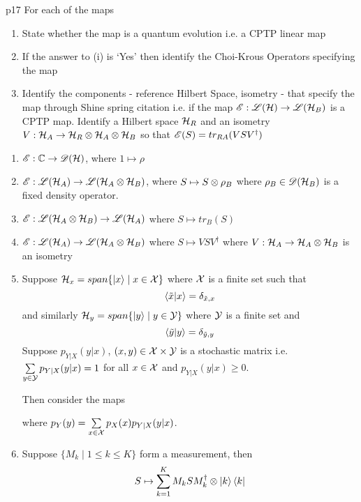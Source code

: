 \documentclass[a4paper, 11pt]{article}
\begin{document}
\begin{problem}{%
	}{p17%
	}
	For each of the maps \begin{enumerate}[label=(\roman*)]
		\item State whether the map is a quantum evolution i.e. a CPTP linear map
		\item If the answer to (i) is `Yes' then identify the Choi-Krous Operators specifying the map
		\item Identify the components - reference Hilbert Space, isometry - that specify the map through Shine spring citation i.e. if the map ${\mathscr{E}}:{\mathscr{L}}(\mathcal{H})\to {\mathscr{L}}(\mathcal{H}_B)$ is a CPTP map. Identify a Hilbert space $\mathcal{H}_R$ and an isometry $V:\mathcal{H}_A\to \mathcal{H}_R\otimes \mathcal{H}_A\otimes \mathcal{H}_B$ so that ${\mathscr{E}}(S)=tr_{RA}(VSV^{\dagger})$
	\end{enumerate}
		\begin{enumerate}[label=(\arabic*)]
			\item ${\mathscr{E}}:\mathbb{C}\to {\mathscr{D}}(\mathcal{H})$, where $1\mapsto \rho$
			\item ${\mathscr{E}}:{\mathscr{L}}(\mathcal{H}_A)\to {\mathscr{L}}(\mathcal{H}_A\otimes \mathcal{H}_B)$, where $S\mapsto S\otimes \rho_B$ where $\rho_B\in {\mathscr{D}}(\mathcal{H}_B)$ is a fixed density operator.
			\item ${\mathscr{E}}:{\mathscr{L}}(\mathcal{H}_A\otimes \mathcal{H}_B)\to{\mathscr{L}}(\mathcal{H}_A) $ where $S\mapsto tr_B(S)$
			\item ${\mathscr{E}}:{\mathscr{L}}(\mathcal{H}_A)\to {\mathscr{L}}(\mathcal{H}_A\otimes \mathcal{H}_B)$ where $S\mapsto VSV^{\dagger}$ where $V:\mathcal{H}_A\to\mathcal{H}_A\otimes \mathcal{H}_B$ is an isometry
			\item Suppose $\mathcal{H}_x=span\{\ket{x}\mid x\in \mathcal{X}\}$ where $\mathcal{X}$ is a finite set such that $$\bra{\tilde{x}}\ket{x}=\delta_{\tilde{x},x}$$and similarly $\mathcal{H}_y = span\{\ket{y}\mid y\in \mathcal{Y}\}$ where $\mathcal{Y}$ is a finite set and $$\bra{\tilde{y}}\ket{y}=\delta_{\tilde{y},y}$$Suppose $p_{Y|X}(y|x)$, $(x,y)\in \mathcal{X}\times \mathcal{Y}$ is a stochastic matrix i.e. $\sum\limits_{y\in \mathcal{Y}}p_{Y|X}(y|x)=1$ for all $x\in \mathcal{X}$ and $p_{Y|X}(y|x)\geq 0$.
				
			Then consider the maps \begin{center}
			\end{center}where $p_Y(y)=\sum\limits_{x\in \mathcal{X}}p_X(x)p_{Y|X}(y|x)$.
			\item Suppose $\{M_k\mid 1\leq k\leq K\}$ form a measurement, then $$S\mapsto \sum_{k=1}^KM_kSM_k^{\dagger}\otimes \ket{k}\bra{k}$$
		\end{enumerate}

\end{problem}
\end{document}

